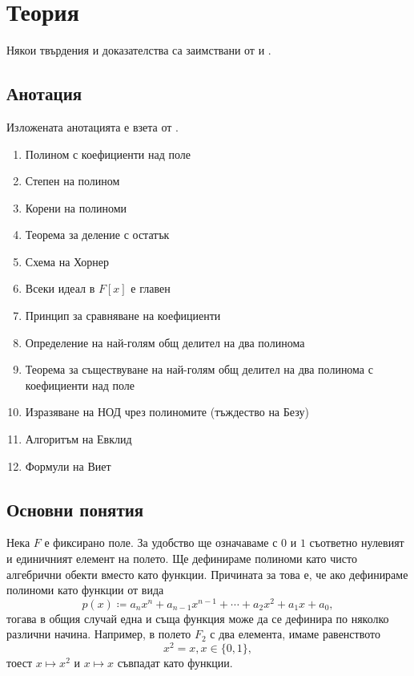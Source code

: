 \documentclass[
  headings=standardclasses,
  bibliography=totocnumbered,
]{scrartcl}
\title{\Title{3}}
\subtitle{Полиноми на една променлива. Теорема за деление с остатък. Най-голям общ делител на полиноми - тъждество на Безу и алгоритъм на Евклид. Зависимост между корени и коефициенти на полиноми (формули на Виет).}
\author{Янис Василев}
\date{\Revision{15 юни 2019}}
\begin{document}
\maketitle

\section{Теория}

Някои твърдения и доказателства са заимствани от \cite{Knapp} и \cite{RoyachkiNotes}.

\subsection{Анотация}

Изложената анотацията е взета от \cite{Syllabus}.

\begin{enumerate}
  \item Полином с коефициенти над поле
  \item Степен на полином
  \item Корени на полиноми
  \item Теорема за деление с остатък
  \item Схема на Хорнер
  \item Всеки идеал в \( F[x] \) е главен
  \item Принцип за сравняване на коефициенти
  \item Определение на най-голям общ делител на два полинома
  \item Теорема за съществуване на най-голям общ делител на два полинома с коефициенти над поле
  \item Изразяване на НОД чрез полиномите (тъждество на Безу)
  \item Алгоритъм на Евклид
  \item Формули на Виет
\end{enumerate}

\subsection{Основни понятия}

Нека \( F \) е фиксирано поле. За удобство ще означаваме с \( 0 \) и \( 1 \) съответно нулевият и единичният елемент на полето. Ще дефинираме полиноми като чисто алгебрични обекти вместо като функции. Причината за това е, че ако дефинираме полиноми като функции от вида
\begin{equation*}
  p(x) \coloneqq a_n x^n + a_{n-1} x^{n-1} + \cdots + a_2 x^2 + a_1 x + a_0,
\end{equation*}
тогава в общия случай една и съща функция може да се дефинира по няколко различни начина. Например, в полето \( F_2 \) с два елемента, имаме равенството
\begin{equation*}
  x^2 = x, x \in \{ 0, 1 \},
\end{equation*}
тоест \( x \mapsto x^2 \) и \( x \mapsto x \) съвпадат като функции.
\end{document}
